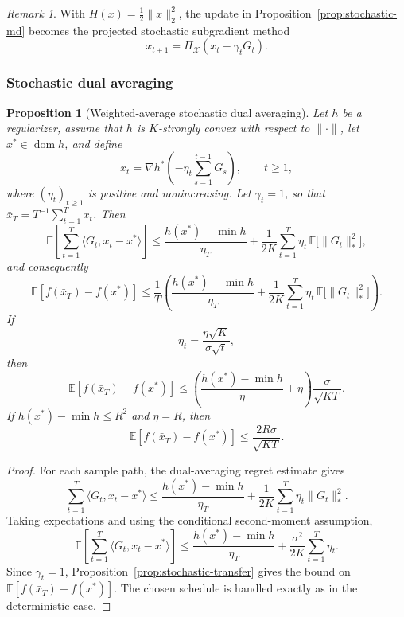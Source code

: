 \documentclass[11pt]{article}
\newtheorem{proposition}[theorem]{Proposition}
\theoremstyle{definition}
\theoremstyle{remark}
\newtheorem{remark}[theorem]{Remark}
\newcommand{\X}{\mathcal{X}}
\newcommand{\E}{\mathbb{E}}
\newcommand{\inner}[2]{\langle #1, #2 \rangle}
\newcommand{\norm}[1]{\lVert #1 \rVert}
\newcommand{\normdual}[1]{\lVert #1 \rVert_*}
\DeclareMathOperator{\dom}{dom}
\begin{document}
\begin{remark}
With $H(x)=\tfrac12\norm{x}_2^2$, the update in Proposition~\ref{prop:stochastic-md} becomes the projected stochastic subgradient method
\[
    x_{t+1}=\Pi_{\X}(x_t-\gamma_t G_t).
\]
\end{remark}

\subsubsection{Stochastic dual averaging}

\begin{proposition}[Weighted-average stochastic dual averaging]
\label{prop:stochastic-da}
Let $h$ be a regularizer, assume that $h$ is $K$-strongly convex with respect to $\norm{\cdot}$, let $x^* \in \dom h$, and define
\[
    x_t = \nabla h^*\!\left(-\eta_t \sum_{s=1}^{t-1} G_s\right),
    \qquad
    t\ge 1,
\]
where $(\eta_t)_{t\ge 1}$ is positive and nonincreasing. Let $\gamma_t=1$, so that $\bar{x}_T = T^{-1}\sum_{t=1}^T x_t$. Then
\[
    \E\left[
        \sum_{t=1}^T \inner{G_t}{x_t-x^*}
    \right]
    \le
    \frac{h(x^*)-\min h}{\eta_T}
    +
    \frac{1}{2K}\sum_{t=1}^T \eta_t\,\E\bigl[\normdual{G_t}^2\bigr],
\]
and consequently
\[
    \E[f(\bar{x}_T)-f(x^*)]
    \le
    \frac{1}{T}
    \left(
        \frac{h(x^*)-\min h}{\eta_T}
        +
        \frac{1}{2K}\sum_{t=1}^T \eta_t\,\E\bigl[\normdual{G_t}^2\bigr]
    \right).
 \]
If
\[
    \eta_t = \frac{\eta\sqrt{K}}{\sigma\sqrt{t}},
\]
then
\[
    \E[f(\bar{x}_T)-f(x^*)]
    \le
    \left(
        \frac{h(x^*)-\min h}{\eta}
        +
        \eta
    \right)
    \frac{\sigma}{\sqrt{KT}}.
\]
If $h(x^*)-\min h \le R^2$ and $\eta=R$, then
\[
    \E[f(\bar{x}_T)-f(x^*)] \le \frac{2R\sigma}{\sqrt{KT}}.
\]
\end{proposition}

\begin{proof}
For each sample path, the dual-averaging regret estimate gives
\[
    \sum_{t=1}^T \inner{G_t}{x_t-x^*}
    \le
    \frac{h(x^*)-\min h}{\eta_T}
    +
    \frac{1}{2K}\sum_{t=1}^T \eta_t \normdual{G_t}^2.
\]
Taking expectations and using the conditional second-moment assumption,
\[
    \E\left[
        \sum_{t=1}^T \inner{G_t}{x_t-x^*}
    \right]
    \le
    \frac{h(x^*)-\min h}{\eta_T}
    +
    \frac{\sigma^2}{2K}\sum_{t=1}^T \eta_t.
\]
Since $\gamma_t=1$, Proposition~\ref{prop:stochastic-transfer} gives the bound on $\E[f(\bar{x}_T)-f(x^*)]$. The chosen schedule is handled exactly as in the deterministic case.
\end{proof}
\end{document}
